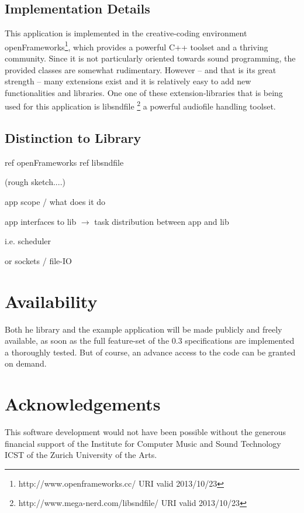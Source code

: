 \documentclass[a4paper]{article}
\begin{document}
\subsection{Implementation Details}

This application is implemented in the creative-coding environment openFrameworks\footnote{http://www.openframeworks.cc/ URI valid 2013/10/23}, which provides a powerful C++ toolset and a thriving community.
Since it is not particularly oriented towards sound programming, the provided classes are somewhat rudimentary.
However -- and that is its great strength -- many extensions exist and it is relatively easy to add new functionalities and libraries.
One one of these extension-libraries that is being used for this application is libsndfile  
\footnote{http://www.mega-nerd.com/libsndfile/ URI valid 2013/10/23} a powerful audiofile handling toolset.
 



\subsection{Distinction to Library}



ref openFrameworks
ref libsndfile


(rough sketch....)

app scope / what does it do

app interfaces to lib $\rightarrow$ task distribution between app and lib

i.e. scheduler

or sockets / file-IO
\section{Availability}%

Both he library and the example application will be made publicly and freely available, as soon as the full feature-set of the 0.3 specifications are implemented a thoroughly tested.
But of course, an advance access to the code can be granted on demand.

\section{Acknowledgements}%

This software development would not have been possible without the generous financial support of the Institute for Computer Music and Sound Technology ICST of the Zurich University of the Arts.
\end{document}
